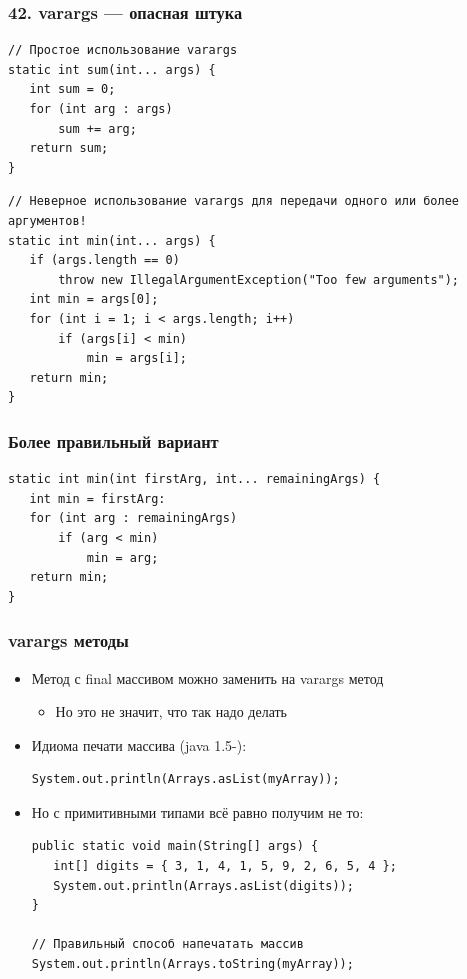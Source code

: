 \documentclass[xetex,mathserif,serif]{beamer}
\begin{document}
	\begin{frame}[fragile]
		\frametitle{42. varargs --- опасная штука}
		\begin{footnotesize}
			\begin{verbatim}
// Простое использование varargs
static int sum(int... args) {
   int sum = 0;
   for (int arg : args)
       sum += arg;
   return sum;
}
			\end{verbatim}
			\pause
			\begin{verbatim}
// Неверное использование varargs для передачи одного или более аргументов!
static int min(int... args) {
   if (args.length == 0)
       throw new IllegalArgumentException("Too few arguments");
   int min = args[0];
   for (int i = 1; i < args.length; i++)
       if (args[i] < min)
           min = args[i];
   return min;
}
			\end{verbatim}
		\end{footnotesize}
	\end{frame}

	\begin{frame}[fragile]
		\frametitle{Более правильный вариант}
		\begin{verbatim}
static int min(int firstArg, int... remainingArgs) {
   int min = firstArg:
   for (int arg : remainingArgs)
       if (arg < min)
           min = arg;
   return min;
}
		\end{verbatim}
	\end{frame}

	\begin{frame}[fragile]
		\frametitle{varargs методы}
		\begin{itemize}
			\item Метод с final массивом можно заменить на varargs метод
			\begin{itemize}
				\item Но это не значит, что так надо делать
			\end{itemize}
			\item Идиома печати массива (java 1.5-):
				\begin{verbatim}
System.out.println(Arrays.asList(myArray));
				\end{verbatim}
			\item Но с примитивными типами всё равно получим не то:
				\begin{verbatim}
public static void main(String[] args) {
   int[] digits = { 3, 1, 4, 1, 5, 9, 2, 6, 5, 4 };
   System.out.println(Arrays.asList(digits));
}

// Правильный способ напечатать массив
System.out.рrintln(Arrays.toString(myArray));
				\end{verbatim}
		\end{itemize}
	\end{frame}
\end{document}
